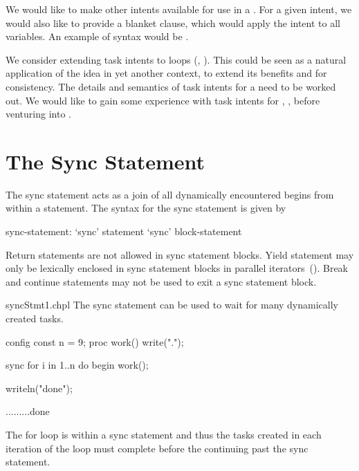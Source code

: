 \begin{future}
We would like to make other intents available for use in a
.
For a given intent, we would also like to provide a blanket clause,
which would apply the intent to all variables.
An example of syntax would be .
\end{future}

\begin{openissue}
We consider extending task intents to  loops
(, ). This could be seen
as a natural application of the idea in yet another context,
to extend its benefits and for consistency. The details and
semantics of task intents for a  need to be
worked out. We would like to gain some experience with task intents
for , ,  before venturing
into .
\end{openissue}


\section{The Sync Statement}
\label{Sync_Statement}

The sync statement acts as a join of all dynamically encountered
begins from within a statement.  The syntax for the sync statement is
given by
\begin{syntax}
sync-statement:
  `sync' statement
  `sync' block-statement
\end{syntax}

Return statements are not allowed in sync statement blocks.  Yield
statement may only be lexically enclosed in sync statement blocks in
parallel iterators~().  Break and continue
statements may not be used to exit a sync statement block.

\begin{chapelexample}{syncStmt1.chpl}
The sync statement can be used to wait for many dynamically created
tasks.
\begin{chapelpre}
config const n = 9;
proc work() {
  write(".");
}
\end{chapelpre}
\begin{chapel}
sync for i in 1..n do begin work();
\end{chapel}
\begin{chapelpost}
writeln("done");
\end{chapelpost}
\begin{chapeloutput}
.........done
\end{chapeloutput}
The for loop is within a sync statement and thus the tasks created
in each iteration of the loop must complete before the continuing past
the sync statement.
\end{chapelexample}

